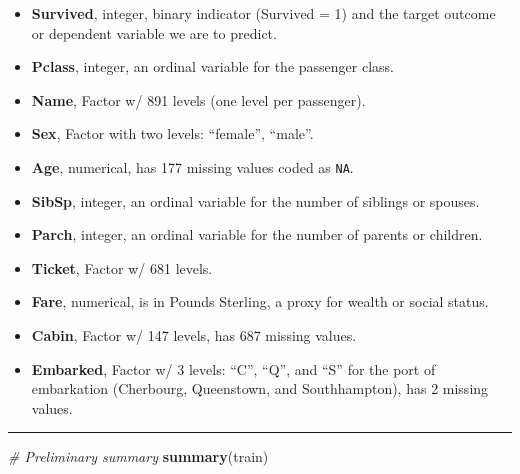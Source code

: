 \documentclass[]{article}
\newenvironment{Shaded}{\begin{snugshade}}{\end{snugshade}}
\newcommand{\KeywordTok}[1]{\textcolor[rgb]{0.13,0.29,0.53}{\textbf{#1}}}
\newcommand{\CommentTok}[1]{\textcolor[rgb]{0.56,0.35,0.01}{\textit{#1}}}
\newcommand{\NormalTok}[1]{#1}
\providecommand{\tightlist}{%
  \setlength{\itemsep}{0pt}\setlength{\parskip}{0pt}}
\begin{document}
\begin{itemize}
\tightlist
\item
  \textbf{Survived}, integer, binary indicator (Survived = 1) and the
  target outcome or dependent variable we are to predict.
\item
  \textbf{Pclass}, integer, an ordinal variable for the passenger class.
\item
  \textbf{Name}, Factor w/ 891 levels (one level per passenger).
\item
  \textbf{Sex}, Factor with two levels: ``female'', ``male''.
\item
  \textbf{Age}, numerical, has 177 missing values coded as \texttt{NA}.
\item
  \textbf{SibSp}, integer, an ordinal variable for the number of
  siblings or spouses.
\item
  \textbf{Parch}, integer, an ordinal variable for the number of parents
  or children.
\item
  \textbf{Ticket}, Factor w/ 681 levels.
\item
  \textbf{Fare}, numerical, is in Pounds Sterling, a proxy for wealth or
  social status.
\item
  \textbf{Cabin}, Factor w/ 147 levels, has 687 missing values.
\item
  \textbf{Embarked}, Factor w/ 3 levels: ``C'', ``Q'', and ``S'' for the
  port of embarkation (Cherbourg, Queenstown, and Southhampton), has 2
  missing values.
\end{itemize}

\begin{center}\rule{0.5\linewidth}{\linethickness}\end{center}

\begin{Shaded}
\begin{Highlighting}[]
\CommentTok{# Preliminary summary}
\KeywordTok{summary}\NormalTok{(train)}
\end{Highlighting}
\end{Shaded}
\end{document}
